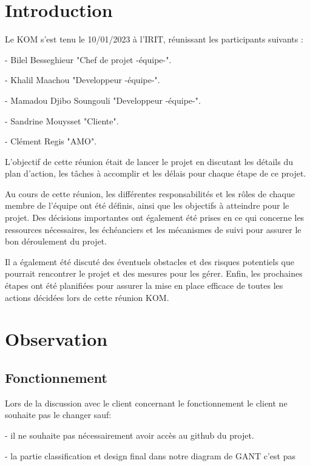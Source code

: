 \documentclass[12pt]{article}
\begin{document}
    \newpage
        \tableofcontents
    \newpage
        \section{Introduction}
        Le KOM s'est tenu le 10/01/2023 à l'IRIT, réunissant les participants suivants : 

            - Bilel Besseghieur "Chef de projet -équipe-".

            - Khalil Maachou "Developpeur -équipe-".

            - Mamadou Djibo Soungouli "Developpeur -équipe-".

            - Sandrine Mouysset "Cliente".

            - Clément Regis "AMO".

        L'objectif de cette réunion était de lancer le projet en discutant les détails du plan d'action, les tâches à accomplir et les délais pour chaque étape de ce projet.

        Au cours de cette réunion, les différentes responsabilités et les rôles de chaque membre de l'équipe ont été définis, ainsi que les objectifs à atteindre pour le projet.
        Des décisions importantes ont également été prises en ce qui concerne les ressources nécessaires, les échéanciers et les mécanismes de suivi pour assurer le bon déroulement du projet.

        Il a également été discuté des éventuels obstacles et des risques potentiels que pourrait rencontrer le projet et des mesures pour les gérer. Enfin, les prochaines étapes ont été planifiées pour assurer la mise en place efficace de toutes les actions décidées lors de cette réunion KOM.

        \section{Observation}

            \subsection{Fonctionnement}
            Lors de la discussion avec le client concernant le fonctionnement le client ne souhaite pas le changer sauf:  

            - il ne souhaite pas nécessairement avoir accès au github du projet.

            - la partie classification et design final dans notre diagram de GANT c'est pas 
\end{document}
